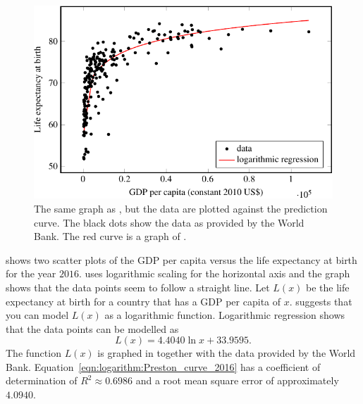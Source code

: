 \documentclass[a4paper,oneside,12pt]{article}
\begin{document}
\begin{problem}
{\begin{solution}
\begin{figure}[!htbp]
\centering
\includegraphics[scale=1.1]{image/12/preston-curve-2016.pdf}
\caption{%
  The same graph as
  , but the data
  are plotted against the prediction curve.  The black dots show the
  data as provided by the World Bank.  The red curve is a graph of
  .
}
\label{fig:logarithm:Preston_curve_2016_model}
\end{figure}

 shows two scatter plots of
the GDP per capita versus the life expectancy at birth for the year
$2016$.   uses
logarithmic scaling for the horizontal axis and the graph shows that
the data points seem to follow a straight line.  Let $L(x)$ be the
life expectancy at birth for a country that has a GDP per capita of
$x$.   suggests that
you can model $L(x)$ as a logarithmic function.  Logarithmic
regression shows that the data points can be modelled as
\begin{equation}
\label{eqn:logarithm:Preston_curve_2016}
L(x)
=
4.4040 \ln x + 33.9595.
\end{equation}
The function $L(x)$ is graphed in
 together with the data
provided by the World Bank.
Equation~\eqref{eqn:logarithm:Preston_curve_2016} has a coefficient of
determination of $R^2 \approx 0.6986$ and a root mean square error of
approximately $4.0940$.


\end{solution}}
\end{problem}
\end{document}
